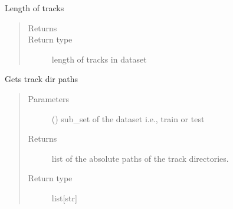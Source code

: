 \documentclass[letterpaper,10pt,english]{sphinxmanual}
\begin{document}
\begin{fulllineitems}
\begin{fulllineitems}
\begin{quote}
\begin{description}
\begin{itemize}
\end{itemize}

\end{description}\end{quote}

\end{fulllineitems}


\begin{fulllineitems}
\label{\detokenize{docs/source/dataset:dataset.Dataset.__len__}}
Length of tracks
\begin{quote}\begin{description}
\item[{Returns}] \leavevmode
{}

\item[{Return type}] \leavevmode
length of tracks in dataset

\end{description}\end{quote}

\end{fulllineitems}


\begin{fulllineitems}
\label{\detokenize{docs/source/dataset:dataset.Dataset.get_track_dir_paths}}
Gets track dir paths
\begin{quote}\begin{description}
\item[{Parameters}] \leavevmode
{} () \textendash{} sub\_set of the dataset i.e., train or test

\item[{Returns}] \leavevmode
list of the absolute paths of the track directories.

\item[{Return type}] \leavevmode
list{[}str{]}

\end{description}\end{quote}


\end{fulllineitems}
\end{fulllineitems}
\end{document}
